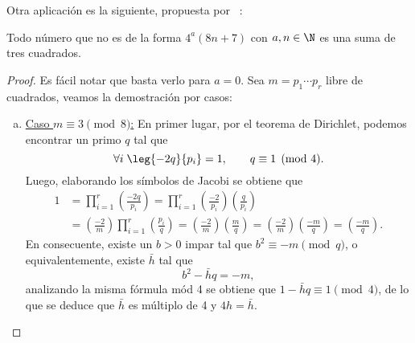 \documentclass[teoria-numeros.tex]{subfiles}
\begin{document}
Otra aplicación es la siguiente, propuesta por \citeauthor{ankeny:squares}~\cite{ankeny:squares}:
\begin{thm}
	Todo número que no es de la forma $4^a(8n + 7)$ con $a, n \in \N$ es una suma de tres cuadrados.
\end{thm}
\begin{proof}
	Es fácil notar que basta verlo para $a = 0$. Sea $m = p_1\cdots p_r$ libre de cuadrados, veamos la demostración por casos:
	\begin{enumerate}[(a)]
		\item \underline{Caso $m\equiv 3 \pmod 8$:} 
			En primer lugar, por el teorema de Dirichlet, podemos encontrar un primo $q$ tal que
			$$ \forall i \; \leg{-2q}{p_i} = 1, \qquad q \equiv 1 \pmod 4. $$
			Luego, elaborando los símbolos de Jacobi se obtiene que
			\begin{align*}
				1 &= \prod_{i=1}^{r} \left( \frac{-2q}{p_i} \right)
				= \prod_{i=1}^{r} \left(\frac{-2}{p_i}\right) \left(\frac{q}{p_i}\right) \\
				  &= \left(\frac{-2}{m}\right) \prod_{i=1}^{r} \left(\frac{p_i}{q}\right)
				  = \left(\frac{-2}{m}\right) \left(\frac{m}{q}\right)
				  = \left(\frac{-2}{m}\right) \left(\frac{-m}{q}\right) = \left(\frac{-m}{q}\right).
			\end{align*}
			En consecuente, existe un $b > 0$ impar tal que $b^2 \equiv -m \pmod q$, o equivalentemente, existe $\bar h$ tal que
			\begin{equation}
				b^2 - \bar hq = -m,
				\label{eq:three_sqr_jacobi_1}
			\end{equation}
			analizando la misma fórmula mód 4 se obtiene que $1 - \bar h q \equiv 1 \pmod 4$, de lo que se deduce que $\bar h$ es múltiplo
			de 4 y $4h = \bar h$.


\end{enumerate}
\end{proof}
\end{document}
